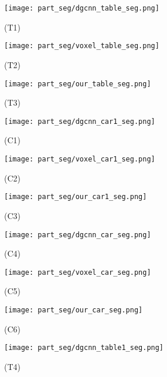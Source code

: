 \documentclass{article}
\begin{document}
\begin{figure}
	\centering
	\begin{subfigure}{.32\textwidth}
		\centering
		\texttt{[image: part\_seg/dgcnn\_table\_seg.png]}
		\caption*{(T1)}
		\label{fig:seg7}
    \end{subfigure}\begin{subfigure}{.32\textwidth}
		\centering
		\texttt{[image: part\_seg/voxel\_table\_seg.png]}
		\caption*{(T2)}
		\label{fig:seg8}
    \end{subfigure}\begin{subfigure}{.32\textwidth}
		\centering
		\texttt{[image: part\_seg/our\_table\_seg.png]}
		\caption*{(T3)}
		\label{fig:seg9}
	\end{subfigure}
		\begin{subfigure}{.32\textwidth}
		\centering
		\texttt{[image: part\_seg/dgcnn\_car1\_seg.png]}
		\caption*{(C1)}
		\label{fig:seg10}
    \end{subfigure}\begin{subfigure}{.32\textwidth}
		\centering
		\texttt{[image: part\_seg/voxel\_car1\_seg.png]}
		\caption*{(C2)}
		\label{fig:seg11}
    \end{subfigure}\begin{subfigure}{.32\textwidth}
		\centering
		\texttt{[image: part\_seg/our\_car1\_seg.png]}
		\caption*{(C3)}
		\label{fig:seg12}
	\end{subfigure}
			\begin{subfigure}{.32\textwidth}
		\centering
		\texttt{[image: part\_seg/dgcnn\_car\_seg.png]}
		\caption*{(C4)}
		\label{fig:seg13}
    \end{subfigure}\begin{subfigure}{.32\textwidth}
		\centering
		\texttt{[image: part\_seg/voxel\_car\_seg.png]}
		\caption*{(C5)}
		\label{fig:seg14}
    \end{subfigure}\begin{subfigure}{.32\textwidth}
		\centering
		\texttt{[image: part\_seg/our\_car\_seg.png]}
		\caption*{(C6)}
		\label{fig:seg15}
	\end{subfigure}
	\begin{subfigure}{.32\textwidth}
		\centering
		\texttt{[image: part\_seg/dgcnn\_table1\_seg.png]}
		\caption*{(T4)}
		\label{fig:seg16}
	\end{subfigure}\begin{subfigure}{.32\textwidth}

\end{subfigure}
\end{figure}
\end{document}

